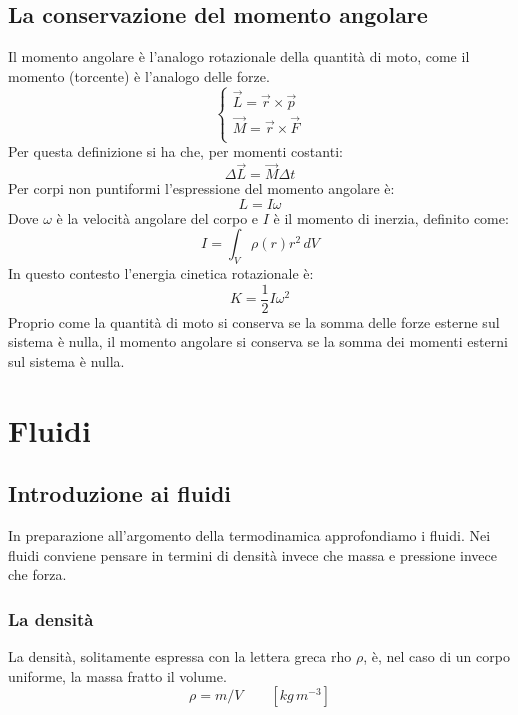 \documentclass{article}
\begin{document}
\subsection{La conservazione del momento angolare}
Il momento angolare è l'analogo rotazionale della quantità di moto, come il momento (torcente) è l'analogo delle forze.
\begin{equation}
    \begin{cases}
        \Vec{L}=\vec{r}\times\Vec{p} \\
        \Vec{M}=\vec{r}\times\Vec{F} \\
    \end{cases}
\end{equation}
Per questa definizione si ha che, per momenti costanti:
\begin{equation}
    \Delta \Vec{L}=\vec{M} \Delta t
\end{equation}
Per corpi non puntiformi l'espressione del momento angolare è:
\begin{equation}
    L=I\omega
\end{equation}
Dove $\omega$ è la velocità angolare del corpo e $I$ è il momento di inerzia, definito come:
\begin{equation}
    I=\int_V \rho(r) r^2 \, dV
\end{equation}
In questo contesto l'energia cinetica rotazionale è:
\begin{equation}
    K=\frac{1}{2}I\omega^2
\end{equation}
Proprio come la quantità di moto si conserva se la somma delle forze esterne sul sistema è nulla, il momento angolare si conserva se la somma dei momenti esterni sul sistema è nulla.

\section{Fluidi}
\subsection{Introduzione ai fluidi}
In preparazione all'argomento della termodinamica approfondiamo i fluidi.
Nei fluidi conviene pensare in termini di densità invece che massa e pressione invece che forza.

\subsubsection{La densità}
La densità, solitamente espressa con la lettera greca rho $\rho$, è, nel caso di un corpo uniforme, la massa fratto il volume.
\begin{equation}
    \rho = m/V \qquad [kg\,m^{-3}]
\end{equation}
\end{document}
